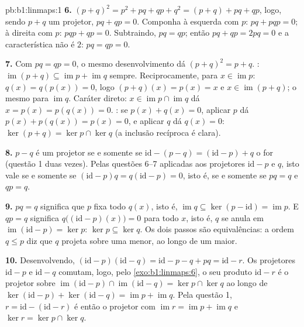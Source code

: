 \begin{solution}{pb:b1:linmaps:1}
\textbf{6.} $(p + q)^2 = p^2 + pq + qp + q^2 = (p + q) + pq +
qp$, logo, sendo $p + q$ um projetor, $pq + qp = 0$. Componha
à esquerda com $p$: $pq + pqp = 0$; à direita com $p$: $pqp + qp
= 0$. Subtraindo,
$pq = qp$; então $pq + qp = 2pq = 0$ e a característica não é $2$: $pq = qp = 0$.

\textbf{7.} Com $pq = qp = 0$, o mesmo desenvolvimento dá $(p +
q)^2 = p + q$. :
$\operatorname{im}(p + q) \subseteq
\operatorname{im} p + \operatorname{im} q$ sempre. Reciprocamente, para $x \in \operatorname{im} p$: $q(x) = q(p(x)) = 0$, logo $(p +
q)(x) = p(x) = x$ e $x \in \operatorname{im}(p+q)$;
o mesmo para $\operatorname{im} q$. Caráter direto: $x \in \operatorname{im} p
\cap \operatorname{im} q$ dá $x = p(x) = p(q(x)) = 0$. : se
$p(x) + q(x) = 0$, aplicar $p$ dá $p(x) +
p(q(x)) = p(x) = 0$, e aplicar $q$ dá $q(x) = 0$: $\ker(p
+ q) = \ker p \cap \ker q$ (a
inclusão recíproca é clara).

\textbf{8.} $p - q$ é um projetor se e somente se $\mathrm{id} - (p - q) =
(\mathrm{id} - p) + q$ o for
(questão 1 duas vezes). Pelas questões 6--7 aplicadas aos
projetores $\mathrm{id} - p$ e $q$, isto vale se e somente se $(\mathrm{id} - p)q = q(\mathrm{id} - p) = 0$, isto é, se
e somente se $pq = q$ e $qp = q$.

\textbf{9.} $pq = q$ significa que $p$ fixa todo $q(x)$, isto é,
$\operatorname{im} q \subseteq \ker(p - \mathrm{id}) =
\operatorname{im} p$. E $qp = q$ significa $q\bigl((\mathrm{id} -
p)(x)\bigr) = 0$ para todo $x$, isto é, $q$ se
anula em $\operatorname{im}(\mathrm{id} - p) = \ker p$: $\ker p \subseteq
\ker q$. Os dois passos são equivalências: a ordem
$q \leq p$ diz que $q$ projeta sobre uma  menor, ao longo de um
 maior.

\textbf{10.} Desenvolvendo, $(\mathrm{id} - p)(\mathrm{id} - q) =
\mathrm{id} - p - q + pq = \mathrm{id} - r$. Os projetores $\mathrm{id} - p$ e $\mathrm{id} - q$
comutam, logo, pelo \cref{exo:b1:linmaps:6}, o seu produto $\mathrm{id} - r$ é o projetor sobre
$\operatorname{im}(\mathrm{id} - p) \cap
\operatorname{im}(\mathrm{id} - q) = \ker p \cap \ker q$ ao longo de $\ker(\mathrm{id} - p) + \ker(\mathrm{id} - q) =
\operatorname{im} p + \operatorname{im} q$. Pela questão 1, $r =
\mathrm{id} - (\mathrm{id} - r)$ é então o projetor
com $\operatorname{im} r = \operatorname{im} p + \operatorname{im}
q$ e $\ker r = \ker p \cap \ker q$.


\end{solution}

